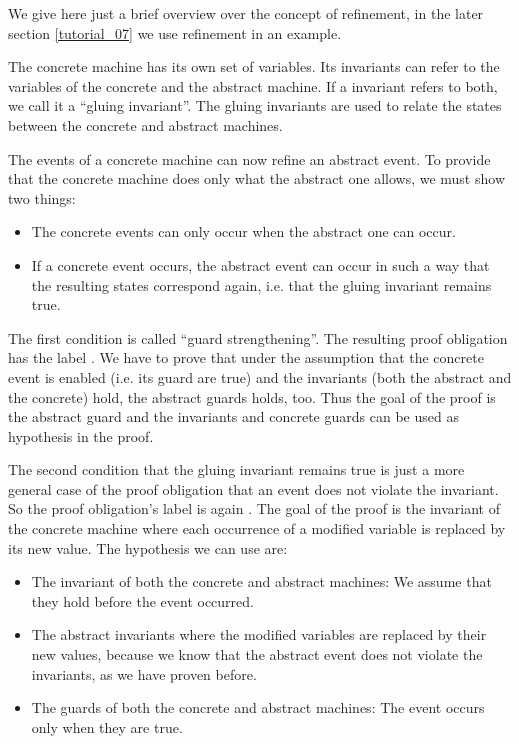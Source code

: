 We give here just a brief overview over the concept of refinement, in the later section \ref{tutorial_07}
we use refinement in an example.

The concrete machine has its own set of variables. Its invariants can refer to
the variables of the concrete and the abstract machine. If a invariant refers to both,
we call it a ``gluing invariant''. The gluing invariants are
used to relate the states between the concrete and abstract machines.

The events of a concrete machine can now refine an abstract event. To provide that the concrete machine
does only what the abstract one allows, we must show two things:
\begin{itemize}
\item The concrete events can only occur when the abstract one can occur.
\item If a concrete event occurs, the abstract event can occur in such a way that the resulting
  states correspond again, i.e. that the gluing invariant remains true.
\end{itemize}

The first condition is called ``guard strengthening''. The resulting proof obligation has the label
. We have to prove that under the assumption that the
concrete event is enabled (i.e. its guard are true) and the invariants (both the abstract and the concrete) 
hold, the abstract guards holds, too. Thus the goal of the proof is the abstract guard and the invariants and
concrete guards can be used as hypothesis in the proof.

The second condition that the gluing invariant remains true is just a more general case of the proof obligation
that an event does not violate the invariant. So the proof obligation's label is again 
. The goal of the proof is the invariant of the concrete
machine where each occurrence of a modified variable is replaced by its new value.
The hypothesis we can use are:
\begin{itemize}
\item The invariant of both the concrete and abstract machines: We assume that they hold before the event occurred.
\item The abstract invariants where the modified variables are replaced by their new values, because
  we know that the abstract event does not violate the invariants, as we have proven before.
\item The guards of both the concrete and abstract machines: The event occurs only when they are true.
\end{itemize}

